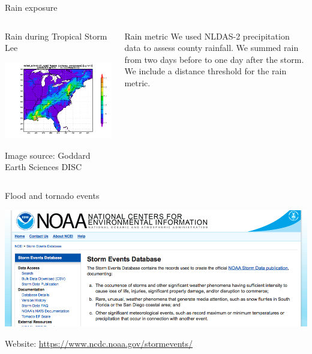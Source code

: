 \documentclass[ignorenonframetext,]{beamer}
\begin{document}
\begin{frame}{Rain exposure}

\begin{columns}
\begin{column}{0.7\textwidth}  
    \vspace{-0.25cm}
    \begin{center}
    Rain during Tropical Storm Lee
    \end{center}
    \begin{center}
     \includegraphics[width=\textwidth]{figures/nldas2_ts_lee.png}
     \end{center}
     \begin{center}
         \vspace{-0.4cm}
     \scriptsize{Image source: Goddard Earth Sciences DISC}
     \end{center}
\end{column}
\begin{column}{0.3\textwidth}
\footnotesize
\begin{block}{Rain metric}
We used NLDAS-2 precipitation data to assess county rainfall. We summed rain from two days before to one day after the storm. We include a distance threshold for the rain metric.
\end{block}
\end{column}
\end{columns}

\end{frame}

\begin{frame}{Flood and tornado events}

\includegraphics[width=\textwidth]{figures/noaastormevents}

Website: \url{https://www.ncdc.noaa.gov/stormevents/}

\end{frame}
\end{document}
